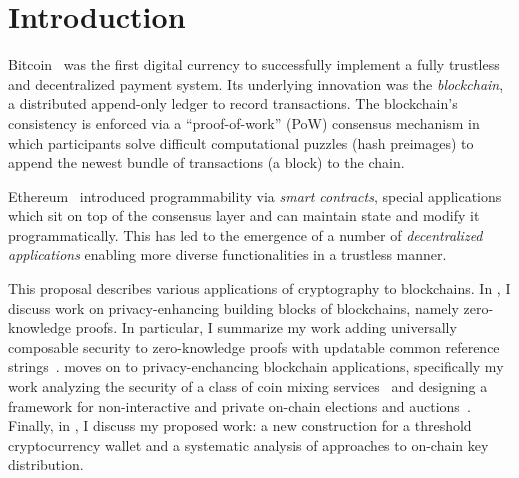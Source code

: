 \section{Introduction}

Bitcoin~\cite{bitcoin} was the first digital currency to successfully implement a fully trustless and decentralized payment system. Its underlying innovation was the \emph{blockchain}, a distributed append-only ledger to record transactions. The blockchain's consistency is enforced via a ``proof-of-work'' (PoW) consensus mechanism in which participants solve difficult computational puzzles (hash preimages) to append the newest bundle of transactions (a block) to the chain. 

Ethereum~\cite{ethereum} introduced programmability via \emph{smart contracts}, special applications which sit on top of the consensus layer and can maintain state and modify it programmatically. This has led to the emergence of a number of \emph{decentralized applications} enabling more diverse functionalities in a trustless manner.

This proposal describes various applications of cryptography to blockchains. In , I discuss work on privacy-enhancing building blocks of blockchains, namely zero-knowledge proofs. In particular, I summarize my work adding universally composable security to zero-knowledge proofs with updatable common reference strings~\cite{CSF:AGRS24}.  moves on to privacy-enchancing blockchain applications, specifically my work analyzing the security of a class of coin mixing services~\cite{CCS:GMMMTT22} and designing a framework for non-interactive and private on-chain elections and auctions~\cite{EPRINT:GSZB23}. Finally, in , I discuss my proposed work: a new construction for a threshold cryptocurrency wallet and a systematic analysis of approaches to on-chain key distribution.




